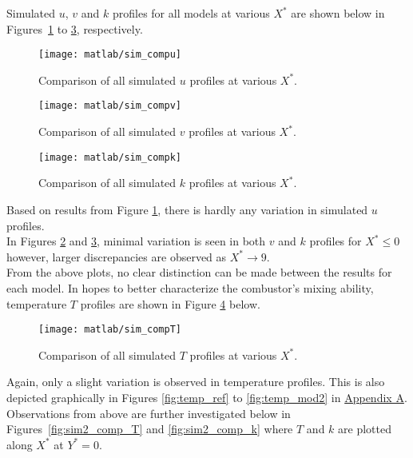 Simulated $u$, $v$ and $k$ profiles for all models at various $X^*$ are shown below in Figures~\ref{fig:sim_compu} to \ref{fig:sim_compk}, respectively.
\begin{figure}[H]
	\centering
	\texttt{[image: matlab/sim\_compu]}
	\caption{Comparison of all simulated $u$ profiles at various $X^*$.}
	\label{fig:sim_compu}
\end{figure}

\begin{figure}[H]
	\centering
	\texttt{[image: matlab/sim\_compv]}
	\caption{Comparison of all simulated $v$ profiles at various $X^*$.}
	\label{fig:sim_compv}
\end{figure}

\begin{figure}[H]
	\centering
	\texttt{[image: matlab/sim\_compk]}
	\caption{Comparison of all simulated $k$ profiles at various $X^*$.}
	\label{fig:sim_compk}
\end{figure}

Based on results from Figure \ref{fig:sim_compu}, there is hardly any variation in simulated $u$ profiles.\\

In Figures \ref{fig:sim_compv} and \ref{fig:sim_compk}, minimal variation is seen in both $v$ and $k$ profiles for $X^* \leq 0$ however, larger discrepancies are observed as $X^* \rightarrow 9$.\\

From the above plots, no clear distinction can be made between the results for each model. In hopes to better characterize the combustor's mixing ability, temperature $T$ profiles are shown in Figure \ref{fig:sim_compT} below.
\begin{figure}[H]
	\centering
	\texttt{[image: matlab/sim\_compT]}
	\caption{Comparison of all simulated $T$ profiles at various $X^*$.}
	\label{fig:sim_compT}
\end{figure}

Again, only a slight variation is observed in temperature profiles. This is also depicted graphically  in Figures \ref{fig:temp_ref} to \ref{fig:temp_mod2} in \hyperlink{appendixa}{Appendix A}.\\

Observations from above are further investigated below in Figures~\ref{fig:sim2_comp_T} and \ref{fig:sim2_comp_k} where $T$ and $k$ are plotted along $X^*$ at $Y^*=0$.


